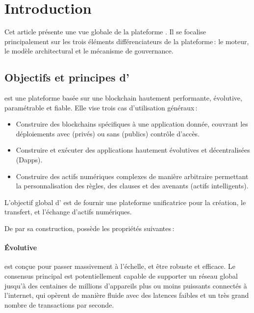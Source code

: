 \documentclass[runningheads,francais,a4paper]{llncs}
\begin{document}
\section{Introduction}
\label{section:introduction}
\setlength{\parindent}{0pt} Cet article présente une vue globale de la plateforme \AVAPlatformName{}. Il se focalise principalement sur les trois éléments
différenciateurs de la plateforme\,: le moteur, le modèle architectural et le mécanisme de gouvernance.

\subsection{Objectifs et principes d'\AVAPlatformName{}}
\AVAPlatformName{} est une plateforme basée sur une blockchain hautement performante, évolutive, paramétrable et fiable.
Elle vise trois cas d'utilisation généraux\,:
\begin{itemize}
\item Construire des blockchains spécifiques à une application donnée, couvrant les déploiements avec (privés) ou sans
  (publics) contrôle d'accès.
\item Construire et exécuter des applications hautement évolutives et décentralisées (Dapps).
\item Construire des actifs numériques complexes de manière arbitraire permettant la personnalisation des règles,
  des clauses et des avenants (actifs intelligents).
\end{itemize}
L'objectif global d'\AVAPlatformName{} est de fournir une plateforme unificatrice pour la création, le transfert, et
l'échange d'actifs numériques.

\noindent De par sa construction, \AVAPlatformName{} possède les propriétés suivantes\,:

\paragraph{Évolutive} \AVAPlatformName{} est conçue pour passer massivement à l'échelle, et être robuste et efficace.
Le consensus principal est potentiellement capable de supporter un réseau global jusqu'à des centaines de millions
d'appareils plus ou moins puissants connectés à l'internet, qui opèrent de manière fluide avec des latences faibles et un
très grand nombre de transactions par seconde.
\end{document}
